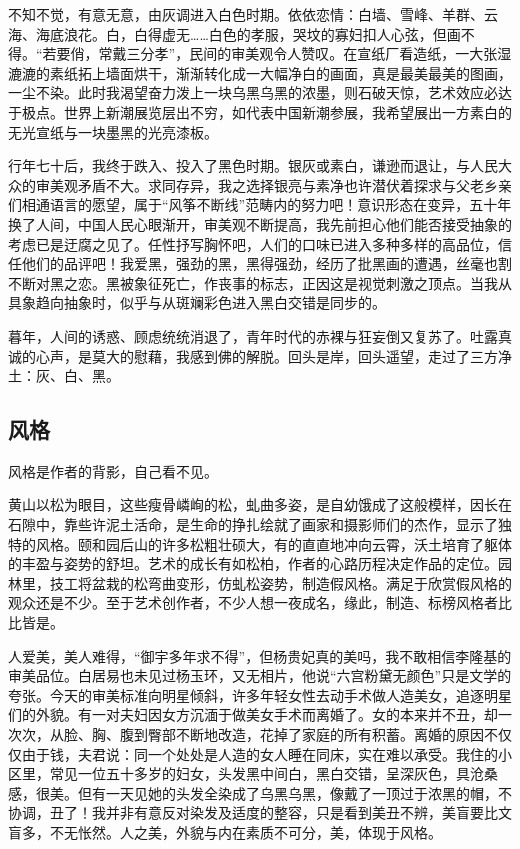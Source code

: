 \documentclass{article}
\begin{document}
不知不觉，有意无意，由灰调进入白色时期。依依恋情：白墙、雪峰、羊群、云海、海底浪花。白，白得虚无……白色的孝服，哭坟的寡妇扣人心弦，但画不得。“若要俏，常戴三分孝”，民间的审美观令人赞叹。在宣纸厂看造纸，一大张湿漉漉的素纸拓上墙面烘干，渐渐转化成一大幅净白的画面，真是最美最美的图画，一尘不染。此时我渴望奋力泼上一块乌黑乌黑的浓墨，则石破天惊，艺术效应必达于极点。世界上新潮展览层出不穷，如代表中国新潮参展，我希望展出一方素白的无光宣纸与一块墨黑的光亮漆板。

行年七十后，我终于跌入、投入了黑色时期。银灰或素白，谦逊而退让，与人民大众的审美观矛盾不大。求同存异，我之选择银亮与素净也许潜伏着探求与父老乡亲们相通语言的愿望，属于“风筝不断线”范畴内的努力吧！意识形态在变异，五十年换了人间，中国人民心眼渐开，审美观不断提高，我先前担心他们能否接受抽象的考虑已是迂腐之见了。任性抒写胸怀吧，人们的口味已进入多种多样的高品位，信任他们的品评吧！我爱黑，强劲的黑，黑得强劲，经历了批黑画的遭遇，丝毫也割不断对黑之恋。黑被象征死亡，作丧事的标志，正因这是视觉刺激之顶点。当我从具象趋向抽象时，似乎与从斑斓彩色进入黑白交错是同步的。

暮年，人间的诱惑、顾虑统统消退了，青年时代的赤裸与狂妄倒又复苏了。吐露真诚的心声，是莫大的慰藉，我感到佛的解脱。回头是岸，回头遥望，走过了三方净土：灰、白、黑。
\subsection{风格}
风格是作者的背影，自己看不见。

黄山以松为眼目，这些瘦骨嶙峋的松，虬曲多姿，是自幼饿成了这般模样，因长在石隙中，靠些许泥土活命，是生命的挣扎绘就了画家和摄影师们的杰作，显示了独特的风格。颐和园后山的许多松粗壮硕大，有的直直地冲向云霄，沃土培育了躯体的丰盈与姿势的舒坦。艺术的成长有如松柏，作者的心路历程决定作品的定位。园林里，技工将盆栽的松弯曲变形，仿虬松姿势，制造假风格。满足于欣赏假风格的观众还是不少。至于艺术创作者，不少人想一夜成名，缘此，制造、标榜风格者比比皆是。

人爱美，美人难得，“御宇多年求不得”，但杨贵妃真的美吗，我不敢相信李隆基的审美品位。白居易也未见过杨玉环，又无相片，他说“六宫粉黛无颜色”只是文学的夸张。今天的审美标准向明星倾斜，许多年轻女性去动手术做人造美女，追逐明星们的外貌。有一对夫妇因女方沉湎于做美女手术而离婚了。女的本来并不丑，却一次次，从脸、胸、腹到臀部不断地改造，花掉了家庭的所有积蓄。离婚的原因不仅仅由于钱，夫君说：同一个处处是人造的女人睡在同床，实在难以承受。我住的小区里，常见一位五十多岁的妇女，头发黑中间白，黑白交错，呈深灰色，具沧桑感，很美。但有一天见她的头发全染成了乌黑乌黑，像戴了一顶过于浓黑的帽，不协调，丑了！我并非有意反对染发及适度的整容，只是看到美丑不辨，美盲要比文盲多，不无怅然。人之美，外貌与内在素质不可分，美，体现于风格。
\end{document}
